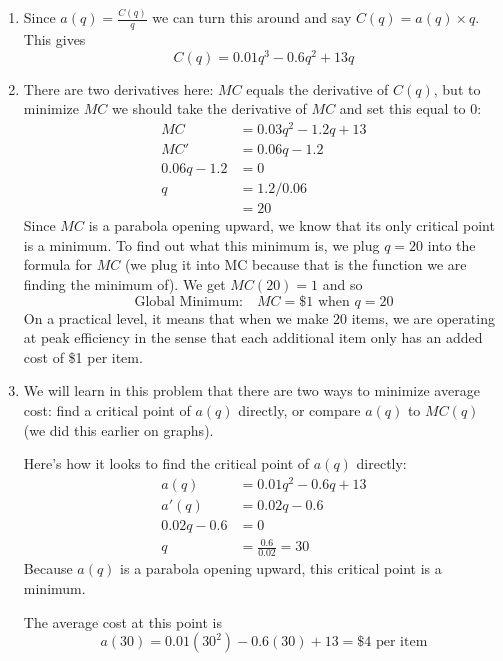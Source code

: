 \documentclass[oneside]{book}
\theoremstyle{definition}
\theoremstyle{solution}
\newtheorem*{solution}{Solution}
\newenvironment{solution}{\vspace{2in}\comment}{\endcomment}
\begin{document}
\begin{solution}
  \begin{enumerate}
  \item Since $a(q)= \frac{C(q)}{q}$ we can turn this around and say
    $C(q) = a(q)\times q$.  This gives
$$
C(q) = 0.01q^3 - 0.6q^2 + 13q
$$

\item There are two derivatives here: $MC$ equals the derivative of
  $C(q)$, but to minimize $MC$ we should take the derivative of $MC$
  and set this equal to $0$:
    \begin{align*}
      MC & = 0.03q^2 - 1.2q + 13\\
      MC' & = 0.06q-1.2 \\
      0.06q-1.2 & = 0\\
      q & = 1.2/0.06 \\
         & = 20
\end{align*}
Since $MC$ is a parabola opening upward, we know that its only
critical point is a minimum.  To find out what this minimum is, we
plug $q = 20$ into the formula for $MC$ (we plug it into MC because
that is the function we are finding the minimum of).  We get
$MC(20) = 1$ and so
$$
\text{Global Minimum:}\quad  MC= \$1\text{ when }q=20
$$
On a practical level, it means that when we make $20$ items, we are
operating at peak efficiency in the sense that each additional item
only has an added cost of \$1 per item.

\item We will learn in this problem that there are two ways to
  minimize average cost: find a critical point of $a(q)$ directly, or
  compare $a(q)$ to $MC(q)$ (we did this earlier on graphs).

  Here's how it looks to find the critical point of $a(q)$ directly:
  \begin{align*}
    a(q) & = 0.01q^2 - 0.6q + 13\\
    a'(q) & = 0.02q - 0.6 \\
    0.02q - 0.6 & = 0 \\
    q & = \frac{0.6}{0.02} = 30
  \end{align*}
  Because $a(q)$ is a parabola opening upward, this critical point is
  a minimum.

  The average cost at this point is
$$
a(30) = 0.01(30^2)-0.6(30)+13 = \$4 \text{ per item}
$$


\end{enumerate}
\end{solution}
\end{document}

